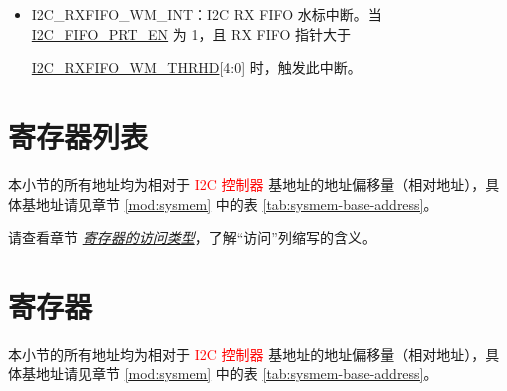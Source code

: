 \documentclass[main\_\_CN.tex]{subfiles}
\begin{document}
\begin{itemize}
\hyperref[fielddesc:I2CTXFIFOWMTHRHD]{I2C\_TXFIFO\_WM\_THRHD}[4:0] 时，触发此中断。
\item \label{int:i2c-rxfifo-wm}I2C\_RXFIFO\_WM\_INT：I2C RX FIFO 水标中断。当 \hyperref[fielddesc:I2CFIFOPRTEN]{I2C\_FIFO\_PRT\_EN} 为 1，且 RX FIFO 指针大于

\hyperref[fielddesc:I2CRXFIFOWMTHRHD]{I2C\_RXFIFO\_WM\_THRHD}[4:0] 时，触发此中断。
\end{itemize}



\clearpage
\section{寄存器列表}
\label{sec:i2c-reg-summ}
\hypertarget{i2c-reg-summ}{}

本小节的所有地址均为相对于 \textcolor{red}{I2C 控制器} 基地址的地址偏移量（相对地址），具体基地址请见章节 \ref{mod:sysmem} \textit{} 中的表 \ref{tab:sysmem-base-address}。

请查看章节 \hyperref[glossary-access-types]{\textit{寄存器的访问类型}}，了解“访问”列缩写的含义。





\clearpage
\section{寄存器}

本小节的所有地址均为相对于 \textcolor{red}{I2C 控制器} 基地址的地址偏移量（相对地址），具体基地址请见章节 \ref{mod:sysmem} \textit{} 中的表 \ref{tab:sysmem-base-address}。


\end{document}
